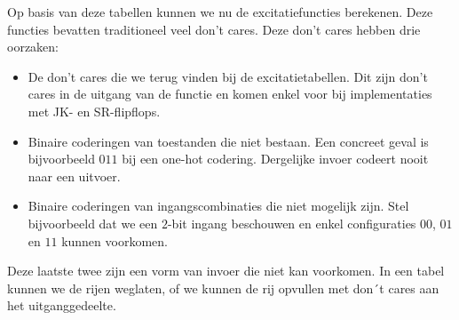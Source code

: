 Op basis van deze tabellen kunnen we nu de excitatiefuncties berekenen. Deze functies bevatten traditioneel veel don't cares. Deze don't cares hebben drie oorzaken:
\begin{itemize}
 \item De don't cares die we terug vinden bij de excitatietabellen. Dit zijn don't cares in de uitgang van de functie en komen enkel voor bij implementaties met JK- en SR-flipflops.
 \item Binaire coderingen van toestanden die niet bestaan. Een concreet geval is bijvoorbeeld $011$ bij een one-hot codering. Dergelijke invoer codeert nooit naar een uitvoer.
 \item Binaire coderingen van ingangscombinaties die niet mogelijk zijn. Stel bijvoorbeeld dat we een $2$-bit ingang beschouwen en enkel configuraties $00$, $01$ en $11$ kunnen voorkomen.
\end{itemize}
Deze laatste twee zijn een vorm van invoer die niet kan voorkomen. In een tabel kunnen we de rijen weglaten, of we kunnen de rij opvullen met don´t cares aan het uitganggedeelte.
